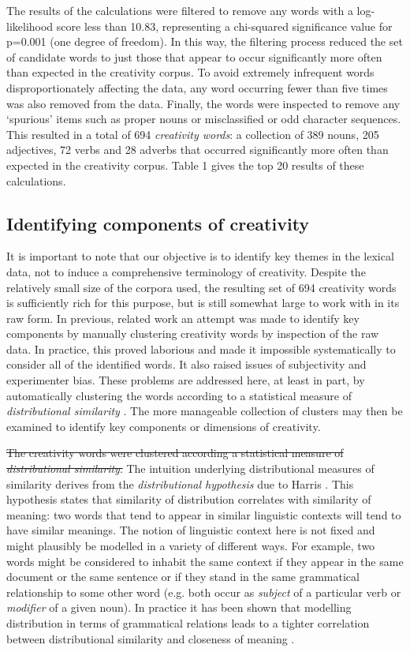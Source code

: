 \documentclass[10pt,letterpaper]{article}
\begin{document}
The results of the calculations were filtered to remove any words with a log-likelihood score less than 10.83, representing a chi-squared significance value for p=0.001 (one degree of freedom). In this way, the filtering process reduced the set of candidate words to just those that appear to occur significantly more often than expected in the creativity corpus. To avoid extremely infrequent words disproportionately affecting the data, any word occurring fewer than five times was also removed from the data. Finally, the words were inspected to remove any `spurious' items such as proper nouns or misclassified or odd character sequences. This resulted in a total of 694 {\em creativity words\/}: a collection of 389 nouns, 205 adjectives, 72 verbs and 28 adverbs that occurred significantly more often than expected in the creativity corpus. Table 1 %
gives the top 20 results of these calculations.



\subsection*{Identifying components of creativity}
\label{creat-comps}

It is important to note that our objective is to identify key themes in the lexical data, not to induce a comprehensive terminology of creativity. Despite the relatively small size of the corpora used, the resulting set of 694 creativity words is sufficiently rich for this purpose, but is still somewhat large to work with in its raw form. In previous, related work \cite{jordanous10a} an attempt was made to identify key components by manually clustering creativity words by inspection of the raw data. In practice, this proved laborious and made it impossible systematically to consider all of the identified words. It also raised issues of subjectivity and experimenter bias. These problems are addressed here, at least in part, by automatically clustering the words according to a statistical measure of {\em distributional similarity\/} \cite{lin98}.  The more manageable collection of clusters may then be examined to identify key components or dimensions of creativity.

\sout{The creativity words were clustered according a statistical measure of {\em distributional similarity\/}. }The intuition underlying distributional measures of similarity derives from the {\em distributional hypothesis\/} due to Harris \cite{harris68}. This hypothesis  states that similarity of distribution correlates with similarity of meaning: two words that tend to appear in similar linguistic contexts will tend to have similar meanings. The notion of linguistic context here is not fixed and might plausibly be modelled in a variety of different ways. For example, two words might be considered to inhabit the same context if they appear in the same document or the same sentence or if they stand in the same grammatical relationship to some other word (e.g. both occur as {\em subject\/} of a particular verb or {\em modifier\/} of a given noun). In practice it has been shown that modelling distribution in terms of grammatical relations leads to a tighter correlation between distributional similarity and closeness of meaning \cite{kilgarriff00}. 
\end{document}
